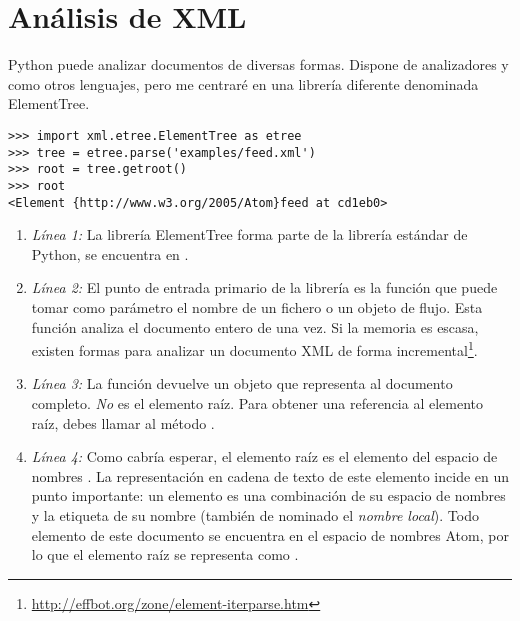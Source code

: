 \section{Análisis de XML}

Python puede analizar documentos  de diversas formas. Dispone de analizadores  y  como otros lenguajes, pero me centraré en una librería diferente denominada ElementTree.

\noindent\begin{minipage}{\textwidth}
\begin{lstlisting}[mathescape=True]
>>> import xml.etree.ElementTree as etree
>>> tree = etree.parse('examples/feed.xml')
>>> root = tree.getroot()
>>> root
<Element {http://www.w3.org/2005/Atom}feed at cd1eb0>
\end{lstlisting}
\end{minipage}

\begin{enumerate}

\item \emph{Línea 1:} La librería ElementTree forma parte de la librería estándar de Python, se encuentra en .

\item \emph{Línea 2:} El punto de entrada primario de la librería es la función  que puede tomar como parámetro el nombre de un fichero o un objeto de flujo. Esta función analiza el documento entero de una vez. Si la memoria es escasa, existen formas para analizar un documento XML de forma incremental\footnote{\href{http://effbot.org/zone/element-iterparse.htm}{http://effbot.org/zone/element-iterparse.htm}}.

\item \emph{Línea 3:} La función  devuelve un objeto que representa al documento completo. \emph{No} es el elemento raíz. Para obtener una referencia al elemento raíz, debes llamar al método .

\item \emph{Línea 4:} Como cabría esperar, el elemento raíz es el elemento  del espacio de nombres . La representación en cadena de texto de este elemento incide en un punto importante: un elemento  es una combinación de su espacio de nombres y la etiqueta de su nombre (también de nominado el \emph{nombre local}). Todo elemento de este documento se encuentra en el espacio de nombres Atom, por lo que el elemento raíz se representa como .

\end{enumerate}

